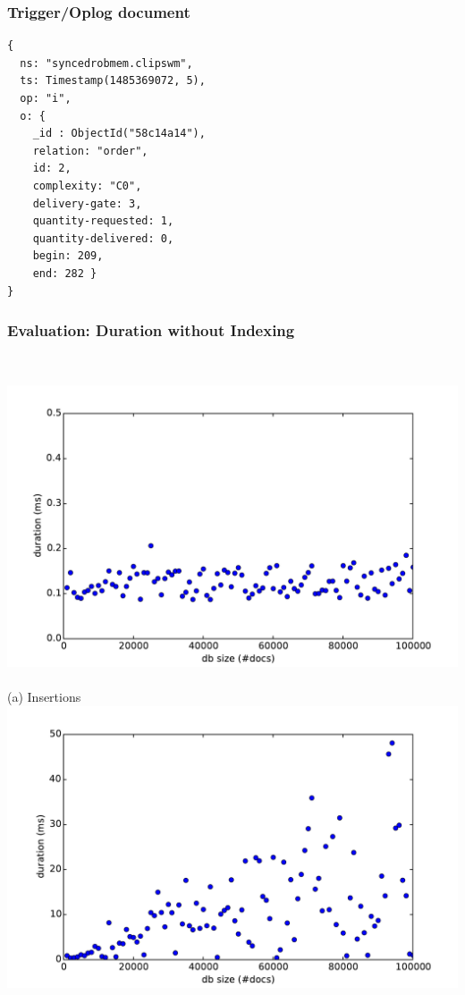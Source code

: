 \begin{frame}[fragile]
  \frametitle{Trigger/Oplog document}
\begin{lstlisting}[style=SmallJSON,
  label=lst:Oplog,
  framexleftmargin=2pt, xleftmargin=0pt,
 morekeywords={}, numbers=none]
{
  ns: "syncedrobmem.clipswm",
  ts: Timestamp(1485369072, 5),
  op: "i",
  o: {
    _id : ObjectId("58c14a14"),
    relation: "order",
    id: 2,
    complexity: "C0",
    delivery-gate: 3,
    quantity-requested: 1,
    quantity-delivered: 0,
    begin: 209,
    end: 282 }
}
\end{lstlisting}
\end{frame}


\begin{frame}
  \frametitle{Evaluation: Duration without Indexing}
  \centering
  \begin{columns}
    \begin{column}{0.55\textwidth}
  \centering
    \small
    \\\vspace{-0.15cm}
    \includegraphics[width=\textwidth]{../thesis/plots/insert-durations}\\
    \\\vspace{-0.05cm}
    (a) Insertions
    \\\vspace{-0.1cm}
    \includegraphics[width=\textwidth]{../thesis/plots/update-durations}\\

\end{column}
\end{columns}
\end{frame}
